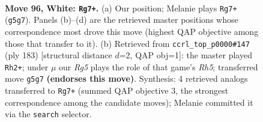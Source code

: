 \documentclass[11pt]{article}
\begin{document}
\begin{figure}[p]\centering
\begin{subfigure}{0.46\textwidth}\centering
\resizebox{\linewidth}{!}{%
\newchessgame
\chessboard[
  setfen={8/2k5/8/6R1/7r/8/5K2/r7 w - - 2 96},
  showmover=false,
  pgfstyle=straightmove, color=movearrow, markmove={g5-g7}
]}
\caption{}
\end{subfigure}\hfill
\begin{subfigure}{0.46\textwidth}\centering
\resizebox{\linewidth}{!}{%
\newchessgame
\chessboard[
  setfen={1k6/8/8/8/7r/2R5/4K3/8 b - - 15 92},
  showmover=false,
  pgfstyle=straightmove, color=movearrow, markmove={h4-h2}
]}
\caption{}
\end{subfigure}
\\[4pt]

\caption{\textbf{Move 96, White: \texttt{Rg7+}.} (a) Our position; Melanie plays \texttt{Rg7+} (\texttt{g5g7}). Panels (b)--(d) are the retrieved master positions whose correspondence most drove this move (highest QAP objective among those that transfer to it). (b) Retrieved from \texttt{ccrl\_top\_p0000\#147} (ply 183) [structural distance $d$=2, QAP obj=1]: the master played \texttt{Rh2+}; under $\mu$ our \emph{Rg5} plays the role of that game's \emph{Rh5}; transferred move \texttt{g5g7} \textbf{(endorses this move)}. Synthesis: 4 retrieved analogs transferred to \texttt{Rg7+} (summed QAP objective 3, the strongest correspondence among the candidate moves); Melanie committed it via the \texttt{search} selector.}
\label{fig:thought-m190}
\end{figure}

\clearpage
\end{document}

